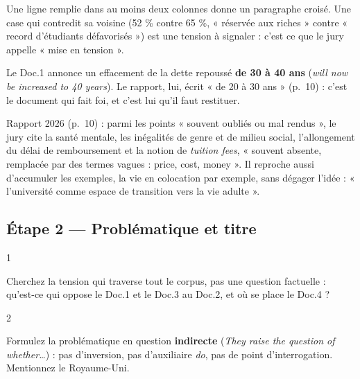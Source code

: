 \documentclass[11pt,a4paper]{article}
\begin{document}
\begin{methode}

Une ligne remplie dans au moins deux colonnes donne un paragraphe croisé. Une case qui contredit sa voisine (52 \% contre 65 \%, « réservée aux riches » contre « record d'étudiants défavorisés ») est une tension à signaler : c'est ce que le jury appelle « mise en tension ».

\end{methode}

\begin{piege}

Le Doc.1 annonce un effacement de la dette repoussé \textbf{de 30 à 40 ans} (\emph{will now be increased to 40 years}). Le rapport, lui, écrit « de 20 à 30 ans » (p.~10) : c'est le document qui fait foi, et c'est lui qu'il faut restituer.

\end{piege}

\begin{jury}

Rapport 2026 (p.~10) : parmi les points « souvent oubliés ou mal rendus », le jury cite la santé mentale, les inégalités de genre et de milieu social, l'allongement du délai de remboursement et la notion de \emph{tuition fees}, « souvent absente, remplacée par des termes vagues : price, cost, money ». Il reproche aussi d'accumuler les exemples, la vie en colocation par exemple, sans dégager l'idée : « l'université comme espace de transition vers la vie adulte ».

\end{jury}

\hypertarget{uxe9tape-2-probluxe9matique-et-titre}{%
\subsection{Étape 2 --- Problématique et titre}\label{uxe9tape-2-probluxe9matique-et-titre}}

\begin{indication}{1}

Cherchez la tension qui traverse tout le corpus, pas une question factuelle : qu'est-ce qui oppose le Doc.1 et le Doc.3 au Doc.2, et où se place le Doc.4 ?

\end{indication}

\begin{indication}{2}

Formulez la problématique en question \textbf{indirecte} (\emph{They raise the question of whether\ldots{}}) : pas d'inversion, pas d'auxiliaire \emph{do}, pas de point d'interrogation. Mentionnez le Royaume-Uni.

\end{indication}
\end{document}
